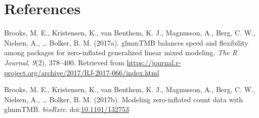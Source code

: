 \documentclass[floatsintext,man]{apa6}
\theoremstyle{definition}
\theoremstyle{definition}
\theoremstyle{definition}
\theoremstyle{remark}
\begin{document}
\FloatBarrier

\newpage

\section{References}\label{refs}

\begingroup
\setlength{\parindent}{-0.5in} \setlength{\leftskip}{0.5in}

\hypertarget{refs}{}
\hypertarget{ref-R-glmmTMB}{}
Brooks, M. E., Kristensen, K., van Benthem, K. J., Magnusson, A., Berg,
C. W., Nielsen, A., \ldots{} Bolker, B. M. (2017a). glmmTMB balances
speed and flexibility among packages for zero-inflated generalized
linear mixed modeling. \emph{The R Journal}, \emph{9}(2), 378--400.
Retrieved from
\url{https://journal.r-project.org/archive/2017/RJ-2017-066/index.html}

\hypertarget{ref-brooks2017modeling}{}
Brooks, M. E., Kristensen, K., van Benthem, K. J., Magnusson, A., Berg,
C. W., Nielsen, A., \ldots{} Bolker, B. M. (2017b). Modeling
zero-inflated count data with glmmTMB. \emph{bioRxiv}.
doi:\href{https://doi.org/10.1101/132753}{10.1101/132753}

\endgroup
\end{document}
